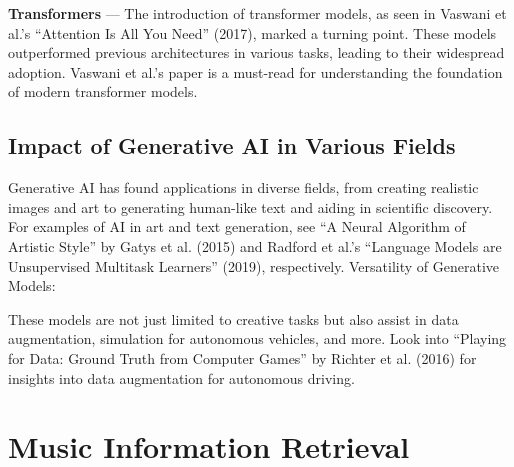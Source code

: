 \documentclass[../main.tex]{subfiles}
\begin{document}
\textbf{Transformers} — The introduction of transformer models, as seen in Vaswani et al.’s “Attention Is All You Need” (2017), marked a turning point. These models outperformed previous architectures in various tasks, leading to their widespread adoption. Vaswani et al.’s paper is a must-read for understanding the foundation of modern transformer models.

\subsection{Impact of Generative AI in Various Fields}

Generative AI has found applications in diverse fields, from creating realistic images and art to generating human-like text and aiding in scientific discovery.
For examples of AI in art and text generation, see “A Neural Algorithm of Artistic Style” by Gatys et al. (2015) and Radford et al.’s “Language Models are Unsupervised Multitask Learners” (2019), respectively.
Versatility of Generative Models:

These models are not just limited to creative tasks but also assist in data augmentation, simulation for autonomous vehicles, and more.
Look into “Playing for Data: Ground Truth from Computer Games” by Richter et al. (2016) for insights into data augmentation for autonomous driving.

\section {Music Information Retrieval}
\end{document}
